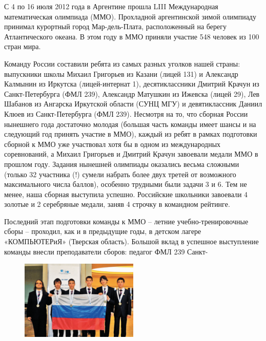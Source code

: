 \begin{multicols}{2}
    {\par \hspace*{0.2cm}С 4 по 16 июля 2012 года в Аргентине прошла LIII Международная математическая олимпиада (ММО). Прохладной аргентинской зимой олимпиаду принимал курортный город Мар-дель-Плата, расположенный на берегу Атлантического океана. В этом году в ММО приняли участие 548 человек из 100 стран мира.}
    {\par \hspace*{0.2cm}Команду России составили ребята из самых разных уголков нашей страны: выпускники школы Михаил Григорьев из Казани (лицей 131) и Александр Калмынин из Иркутска (лицей-интернат 1), десятиклассники Дмитрий Крачун из Санкт-Петербурга (ФМЛ 239), Александр Матушкин из Ижевска (лицей 29), Лев Шабанов из Ангарска Иркутской области (СУНЦ МГУ) и девятиклассник Даниил Клюев из Санкт-Петербурга (ФМЛ 239). Несмотря на то, что сборная России нынешнего года достаточно молодая (большая часть команды имеет шансы и на следующий год принять участие в ММО), каждый из ребят в рамках подготовки сборной к ММО уже участвовал хотя бы в одном из международных соревнований, а Михаил Григорьев и Дмитрий Крачун завоевали медали ММО в прошлом году. Задания нынешней олимпиады оказались весьма сложными (только 32 участника (!) сумели набрать более двух третей от возможного максимального числа баллов), особенно трудными были задачи 3 и 6. Тем не менее, наша сборная выступила успешно. Российские школьники завоевали 4 золотые и 2 серебряные медали, заняв 4 строчку в командном рейтинге.}
    {\par \hspace*{0.2cm}Последний этап подготовки команды к ММО – летние учебно-тренировочные сборы – проходил, как и в предыдущие годы, в детском лагере «КОМПЬЮТЕРиЯ» (Тверская область). Большой вклад в успешное выступление команды внесли преподаватели сборов: педагог ФМЛ 239 Санкт-}
    \newcolumn
    \columnbreak
    \begin{figure}[H]
        \centering
        \includegraphics[width=0.5\textwidth]{pic.png}

\end{figure}
\end{multicols}
